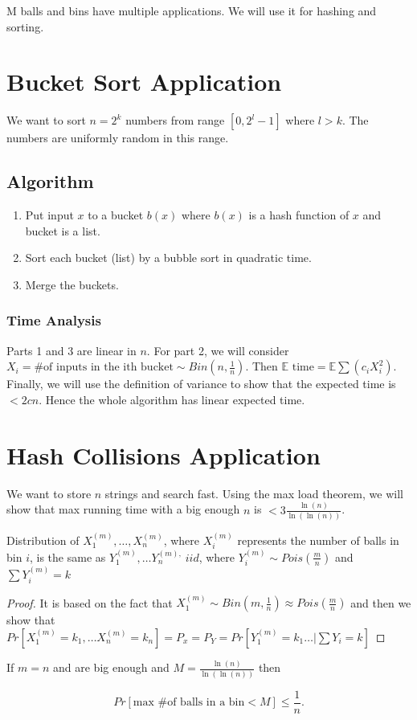 M balls and bins have multiple applications. We will use it for hashing and sorting.

\section{Bucket Sort Application}

We want to sort $n = 2^k$ numbers from range $[0, 2^l-1]$ where $l > k$. The numbers are uniformly random in this range.

\subsection{Algorithm}

\begin{enumerate}
	\item Put input $x$ to a bucket $b(x)$ where $b(x)$ is a hash function of $x$ and bucket is a list.
	\item Sort each bucket (list) by a bubble sort in quadratic time.
	\item Merge the buckets.
\end{enumerate}

\subsubsection{Time Analysis}

Parts 1 and 3 are linear in $n$. For part 2, we will consider $X_i = \# \text{of inputs in the ith bucket} \sim Bin(n, \frac{1}{n})$. Then $\mathbb{E} \text{ time} = \mathbb{E} \sum (c_iX_i^2)$. Finally, we will use the definition of variance to show that the expected time is $ < 2cn$. Hence the whole algorithm has linear expected time.

\section{Hash Collisions Application}

We want to store $n$ strings and search fast. Using the max load theorem, we will show that max running time with a big enough $n$ is $< 3 \frac{\ln(n)}{\ln(\ln(n))}$.

\begin{thm}
	Distribution of $X^{(m)}_{1}, \dots, X^{(m)}_n$, where $X_i^{(m)} $ represents the number of balls in bin $i$, is the same as $Y^{(m)}_1, \dots Y^{(m),}_n \ iid$, where $Y^{(m)}_i \sim Pois\left(\frac{m}{n}\right)$ and $\sum Y_i^{(m)} = k$
\end{thm}

\begin{proof}
	It is based on the fact that $X^{(m)}_1 \sim Bin(m, \frac{1}{n}) \approx Pois(\frac{m}{n})$ and then we show that $Pr[X^{(m)}_1 = k_1, \dots X^{(m)}_n = k_n] = P_x = P_Y = Pr[Y^{(m)}_1 = k_1 \dots \vert \sum Y_i = k ]$
\end{proof}

\begin{thm}
	If $m=n$ and are big enough and $M = \frac{\ln(n)}{\ln\left(\ln\left(n\right)\right)}$ then
	
	$$
	Pr[\text{max \# of balls in a bin} < M] \leq \frac{1}{n}.
	$$
\end{thm}
